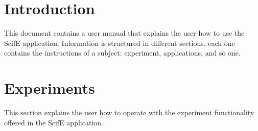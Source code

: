 \documentclass[11pt]{article}
\begin{document}
\newpage
\thispagestyle{empty}
\tableofcontents
\clearpage
\thispagestyle{empty}
\listoffigures
\clearpage
\setcounter{page}{1}

\section{Introduction}
This document contains a user manual that explains the user how to use the ScifE application. Information is structured in different sections, each one contains the instructions of a subject: experiment, applications, and so one.

\section{Experiments}
This section explains the user how to operate with the experiment functionality offered in the ScifE application.
\end{document}
